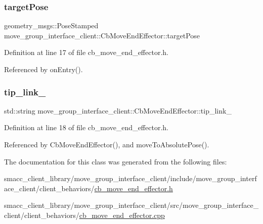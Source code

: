 \subsubsection{\texorpdfstring{target\+Pose}{targetPose}}
{\footnotesize\ttfamily geometry\+\_\+msgs\+::\+Pose\+Stamped move\+\_\+group\+\_\+interface\+\_\+client\+::\+Cb\+Move\+End\+Effector\+::target\+Pose}



Definition at line 17 of file cb\+\_\+move\+\_\+end\+\_\+effector.\+h.



Referenced by on\+Entry().

\mbox{\label{classmove__group__interface__client_1_1CbMoveEndEffector_a26d35b0beeb0476a62a46b9b9d659251}} 
\subsubsection{\texorpdfstring{tip\+\_\+link\+\_\+}{tip\_link\_}}
{\footnotesize\ttfamily std\+::string move\+\_\+group\+\_\+interface\+\_\+client\+::\+Cb\+Move\+End\+Effector\+::tip\+\_\+link\+\_\+}



Definition at line 18 of file cb\+\_\+move\+\_\+end\+\_\+effector.\+h.



Referenced by Cb\+Move\+End\+Effector(), and move\+To\+Absolute\+Pose().



The documentation for this class was generated from the following files\+:\begin{DoxyCompactItemize}
\item 
smacc\+\_\+client\+\_\+library/move\+\_\+group\+\_\+interface\+\_\+client/include/move\+\_\+group\+\_\+interface\+\_\+client/client\+\_\+behaviors/\hyperlink{cb__move__end__effector_8h}{cb\+\_\+move\+\_\+end\+\_\+effector.\+h}\item 
smacc\+\_\+client\+\_\+library/move\+\_\+group\+\_\+interface\+\_\+client/src/move\+\_\+group\+\_\+interface\+\_\+client/client\+\_\+behaviors/\hyperlink{cb__move__end__effector_8cpp}{cb\+\_\+move\+\_\+end\+\_\+effector.\+cpp}\end{DoxyCompactItemize}

